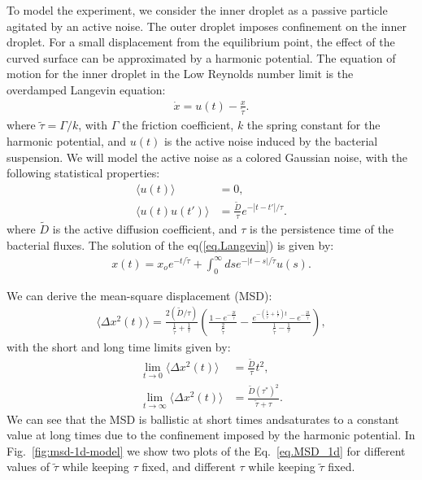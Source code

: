 \documentclass[%
10pt,
superscriptaddress,
twocolumn,
 amsmath,amssymb,
 aps,prx,
]{revtex4-2}
\begin{document}
To model the experiment, we consider the inner droplet as a passive particle agitated by an active noise.
The outer droplet imposes confinement on the inner droplet.
For a small displacement from the equilibrium point, the effect of the curved surface can be approximated by a harmonic potential.
The equation of motion for the inner droplet in the Low Reynolds number limit is the overdamped Langevin equation:
%
\begin{align}
    \label{eq.Langevin}
    \dot{x}=u(t)-\frac{x}{\tilde{\tau}}.
\end{align}
%
where $\tilde{\tau}=\Gamma/k$, with $\Gamma$ the friction coefficient, $k$ the spring constant for the harmonic potential, and $u(t)$ is the active noise induced by the bacterial suspension.
We will model the active noise as a colored Gaussian noise, with the following statistical properties:
%
\begin{align}
    \label{eq.act.noise}
    \langle u(t)\rangle &=0,\\
    \langle u(t)u(t')\rangle &=\frac{\tilde{D}}{\tau}e^{-|t-t'|/\tau}.
\end{align}
%
where $\tilde{D}$ is the active diffusion coefficient, and $\tau$ is the persistence time of the bacterial fluxes. The solution of the eq(\ref{eq.Langevin}) is given by:
%
\begin{align}
    \label{sol:langevin}
    x(t) = x_oe^{-t/\tilde{\tau}}+\int_{0}^{\infty}ds e^{-|t-s|/\tilde{\tau}}u(s).
\end{align}

We can derive the mean-square displacement (MSD):
%
\begin{align}
    \label{eq.MSD_1d}
    \langle \Delta x^2(t)\rangle = \frac{2(\tilde{D}/\tau)}{\frac{1}{\tilde{\tau}}+\frac{1}{\tau}}\left(\frac{1-e^{-\frac{2t}{\tilde{\tau}}}}{\frac{2}{\tilde{\tau}}}-\frac{e^{-(\frac{1}{\tilde{\tau}}+\frac{1}{\tau})t}-e^{-\frac{2t}{\tilde{\tau}}}}{\frac{1}{\tilde{\tau}}-\frac{1}{\tau}}\right),
\end{align}
%
with the short and long time limits given by:
%
\begin{align}
    \label{eq.limits}
    \lim_{t\to0} \langle \Delta x^2(t)\rangle & = \frac{\tilde{D}}{\tau}t^2,\\
    \lim_{t\to\infty} \langle \Delta x^2(t)\rangle & =\frac{\tilde{D}(\tau^*)^2}{\tilde{\tau}+\tau}.
\end{align}
%
We can see that the MSD is ballistic at short times andsaturates to a constant value at long times due to the confinement imposed by the harmonic potential. In Fig.~\ref{fig:msd-1d-model} we show two plots of the Eq.~\ref{eq.MSD_1d} for different values of $\tilde{\tau}$ while keeping $\tau$ fixed, and different $\tau$ while keeping $\tilde{\tau}$ fixed.
\end{document}
